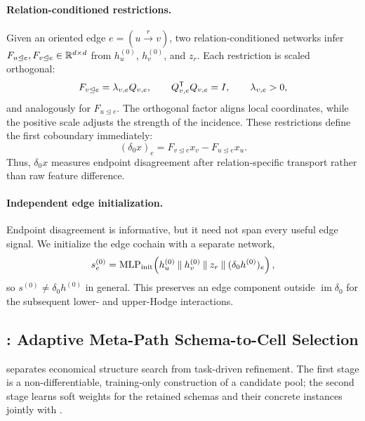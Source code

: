 \paragraph{Relation-conditioned restrictions.}
Given an oriented edge \(e=(u\xrightarrow{r}v)\), two relation-conditioned networks infer
\(F_{u\unlhd e},F_{v\unlhd e}\in\mathbb{R}^{d\times d}\) from
\(h_u^{(0)}\), \(h_v^{(0)}\), and \(z_r\).  Each restriction is scaled orthogonal:
\begin{equation}
  F_{v\unlhd e}=\lambda_{v,e}Q_{v,e},
  \qquad Q_{v,e}^{\mathsf{T}}Q_{v,e}=I,
  \qquad \lambda_{v,e}>0 ,
  \label{eq:conformal-map}
\end{equation}
and analogously for \(F_{u\unlhd e}\).  The orthogonal factor aligns local coordinates, while the
positive scale adjusts the strength of the incidence.  These restrictions define the first
coboundary immediately:
\begin{equation}
  (\delta_0x)_e
  =F_{v\unlhd e}x_v-F_{u\unlhd e}x_u .
  \label{eq:delta0}
\end{equation}
Thus, \(\delta_0x\) measures endpoint disagreement after relation-specific transport rather than
raw feature difference.

\paragraph{Independent edge initialization.}
Endpoint disagreement is informative, but it need not span every useful edge signal.  We initialize
the edge cochain with a separate network,
\begin{equation}
  s_e^{(0)}
  =\operatorname{MLP}_{\mathrm{init}}\!\left(
    h_u^{(0)}\mathbin\Vert h_v^{(0)}\mathbin\Vert z_r
    \mathbin\Vert(\delta_0h^{(0)})_e
  \right),
  \label{eq:edge-init}
\end{equation}
so \(s^{(0)}\neq\delta_0h^{(0)}\) in general.  This preserves an edge component outside
\(\operatorname{im}\delta_0\) for the subsequent lower- and upper-Hodge interactions.

\subsection{\ampss{}: Adaptive Meta-Path Schema-to-Cell Selection}
\label{sec:ampss}

\ampss{} separates economical structure search from task-driven refinement.  The first stage is a
non-differentiable, training-only construction of a candidate pool; the second stage learns soft
weights for the retained schemas and their concrete instances jointly with \method{}.

